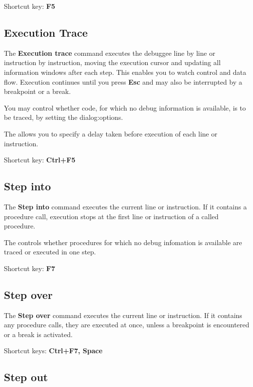 Shortcut key: {\bf F5}

\subsection{Execution Trace}
\label{dialog:executing:trace}

The {\bf Execution trace} command executes the debuggee line by line
or instruction by instruction, moving the execution cursor
and updating all information windows after each step. This enables
you to watch control and data flow. Execution continues until you press {\bf Esc}
and may also be interrupted by a breakpoint or a break.

You may control whether code, for which no debug information is available,
is to be traced, by setting the 
{dialog:options}.

The  allows you to specify
a delay taken before execution of each line or instruction.

Shortcut key: {\bf Ctrl+F5}

\subsection{Step into}
\label{dialog:executing:stepinto}

The {\bf Step into} command executes the current line or instruction.
If it contains a procedure call, execution stops at the first line
or instruction of a called procedure.

The  controls whether
procedures for which no debug infomation is available are traced
or executed in one step.

Shortcut key: {\bf F7}

\subsection{Step over}
\label{dialog:executing:stepover}

The {\bf Step over} command executes the current line or instruction.
If it contains any procedure calls, they are executed at once, unless
a breakpoint is encountered or a break is activated.

Shortcut keys: {\bf Ctrl+F7, Space}

\subsection{Step out}
\label{dialog:executing:stepout}

